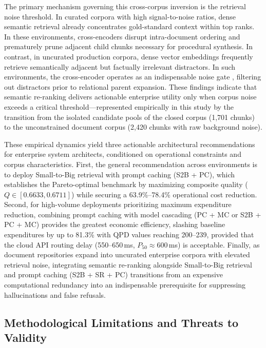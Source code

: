 The primary mechanism governing this cross-corpus inversion is the retrieval noise threshold. In curated corpora with high signal-to-noise ratios, dense semantic retrieval already concentrates gold-standard context within top ranks. In these environments, cross-encoders disrupt intra-document ordering and prematurely prune adjacent child chunks necessary for procedural synthesis. In contrast, in uncurated production corpora, dense vector embeddings frequently retrieve semantically adjacent but factually irrelevant distractors. In such environments, the cross-encoder operates as an indispensable noise gate \citep{moreira2024enhancing, cheng2026enhancing}, filtering out distractors prior to relational parent expansion. These findings indicate that semantic re-ranking delivers actionable enterprise utility only when corpus noise exceeds a critical threshold---represented empirically in this study by the transition from the isolated candidate pools of the closed corpus (1,701 chunks) to the unconstrained document corpus (2,420 chunks with raw background noise).

These empirical dynamics yield three actionable architectural recommendations for enterprise system architects, conditioned on operational constraints and corpus characteristics. First, the general recommendation across environments is to deploy Small-to-Big retrieval with prompt caching (S2B + PC), which establishes the Pareto-optimal benchmark by maximizing composite quality ($Q \in [0.6633, 0.6711]$) while securing a 63.9\%--78.4\% operational cost reduction. Second, for high-volume deployments prioritizing maximum expenditure reduction, combining prompt caching with model cascading (PC + MC or S2B + PC + MC) provides the greatest economic efficiency, slashing baseline expenditures by up to 81.3\% with QPD values reaching 200--239, provided that the cloud API routing delay (550--650\,ms, $P_{50} \approx 600$\,ms) is acceptable. Finally, as document repositories expand into uncurated enterprise corpora with elevated retrieval noise, integrating semantic re-ranking alongside Small-to-Big retrieval and prompt caching (S2B + SR + PC) transitions from an expensive computational redundancy into an indispensable prerequisite for suppressing hallucinations and false refusals.

\subsection{Methodological Limitations and Threats to Validity}
\label{subsec:disc_limitations}

